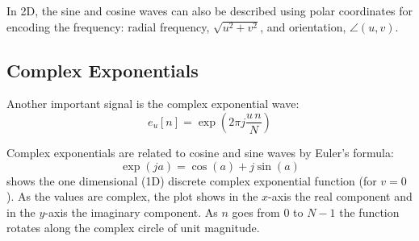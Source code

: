 In 2D, the sine and cosine waves can also be described using polar coordinates for encoding the frequency: radial frequency, $\sqrt{u^2+v^2}$, and orientation, $\angle (u,v)$.







\subsection{Complex Exponentials}

Another important signal is the complex exponential wave:
\begin{equation}
	e_{u}\left[n\right] = \exp \left(2 \pi j   \frac{u\, n}{N}   \right)
\end{equation}

Complex exponentials are related to cosine and sine waves by Euler's formula:
\begin{equation}
	\label{eq:euler}
	\exp \left(j a\right) = \cos (a) + j \sin (a)
\end{equation}
\Fig{\ref{fig:complexexponential}} shows the one dimensional (1D) discrete complex exponential function (for $v=0$). As the values are complex, the plot shows in the $x$-axis the real component and in the $y$-axis the imaginary component. As $n$ goes from 0 to $N-1$ the function rotates along the complex circle of unit magnitude.


